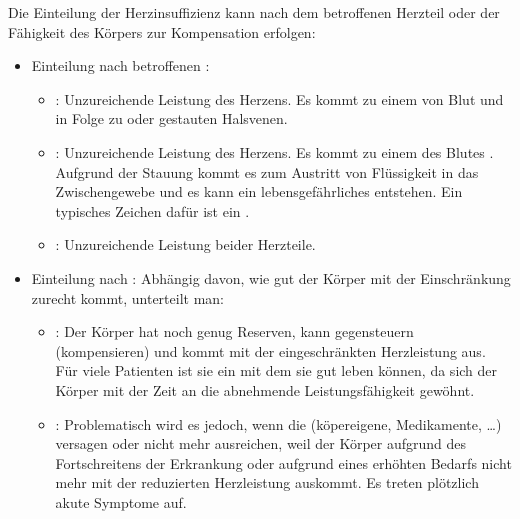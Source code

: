{Die Einteilung der Herzinsuffizienz kann nach
dem betroffenen Herzteil oder der Fähigkeit des Körpers zur
Kompensation erfolgen:
\begin{itemize}
  \item Einteilung nach betroffenen :
  \begin{itemize}
    \item {}: Unzureichende Leistung des 
    Herzens. Es kommt zu einem  von Blut  und in Folge zu
     oder
    gestauten Halsvenen.
    \item {}:
    Unzureichende Leistung des  Herzens. Es kommt
     zu einem  des Blutes . Aufgrund der Stauung kommt es zum
    Austritt von Flüssigkeit in das Zwischengewebe und es
    kann ein lebensgefährliches 
    entstehen.
    Ein typisches Zeichen dafür ist ein
    .
    \item {}: Unzureichende Leistung beider Herzteile.
  \end{itemize}
  \item Einteilung nach : Abhängig davon, wie
  gut der Körper mit der
  Einschränkung zurecht kommt, unterteilt man:
  \begin{itemize}
    \item {}: 
    Der Körper hat noch genug Reserven, 
    kann gegensteuern (kompensieren) 
    und kommt mit der eingeschränkten Herzleistung aus. 
    Für viele Patienten ist sie ein  mit dem sie
    gut leben können, da sich der Körper mit der Zeit an die
    abnehmende Leistungsfähigkeit gewöhnt.
    \item {}:
    Problematisch wird es jedoch, 
    wenn die  
    (köpereigene, Medikamente, {\dots}) versagen 
    oder nicht mehr ausreichen, 
    weil der Körper aufgrund des Fortschreitens der Erkrankung 
    oder aufgrund eines erhöhten Bedarfs nicht mehr
    mit der reduzierten Herzleistung auskommt.
    Es treten plötzlich akute Symptome auf.    
  \end{itemize}
\end{itemize}


}
